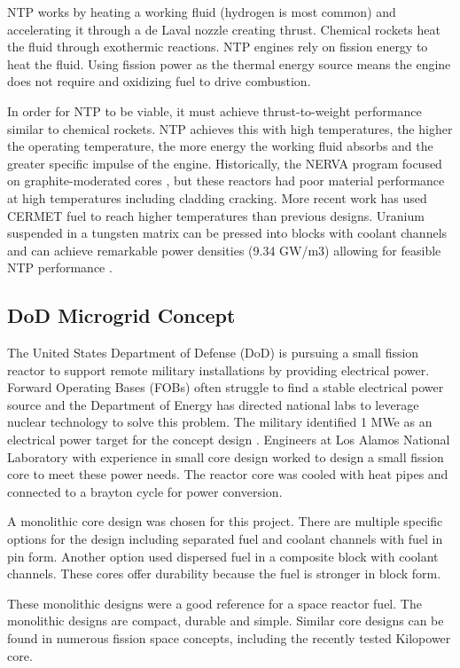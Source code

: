     NTP works by heating a working fluid (hydrogen is most common) and
    accelerating it through a de Laval nozzle creating thrust. Chemical rockets
    heat the fluid through exothermic reactions. NTP engines rely on fission
    energy to heat the fluid. Using fission power as the thermal energy source means the engine does not require and
    oxidizing fuel to drive combustion.

    In order for NTP to be viable, it must achieve thrust-to-weight performance
    similar to chemical rockets. NTP achieves this with high temperatures, the
    higher the operating temperature, the more energy the working fluid absorbs
    and the greater specific impulse of the engine. Historically, the NERVA
    program focused on graphite-moderated cores \citep{webb_combined_2011}, but
    these reactors had poor material performance at high temperatures including
    cladding cracking. More recent work has used CERMET fuel to reach higher
    temperatures than previous designs. Uranium suspended in a tungsten matrix
    can be pressed into blocks with coolant channels and can achieve remarkable
    power densities (9.34 GW/m3) allowing for feasible NTP performance
    \citep{webb_combined_2011}.

    \subsection{DoD Microgrid Concept}
    The United States Department of Defense (DoD) is pursuing a small fission
    reactor to support remote military installations by providing electrical
    power. Forward Operating Bases (FOBs) often struggle to find a stable
    electrical power source and the Department of Energy has directed national
    labs to leverage nuclear technology to solve this problem. The military
    identified 1 MWe as an electrical power target for the concept design
    \citep{army_reactor_slides}.
    Engineers at Los Alamos National Laboratory with experience in small core
    design worked to design a small fission core to meet these power needs. The
    reactor core was cooled with heat pipes and connected to a brayton cycle for
    power conversion.

    A monolithic core design was chosen for this project. There are multiple
    specific options for the design including separated fuel and coolant
    channels with fuel in pin form. Another option used dispersed fuel in a
    composite block with coolant channels. These cores offer durability because
    the fuel is stronger in block form.

    These monolithic designs were a good reference for a space reactor fuel.
    The monolithic designs are compact, durable and simple. Similar core designs
    can be found in numerous fission space concepts, including the recently
    tested Kilopower core.
